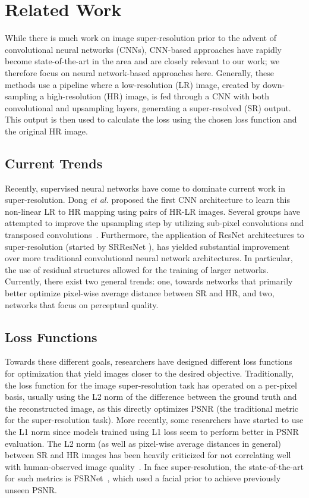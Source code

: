 \documentclass[10pt,twocolumn,letterpaper]{article}
\begin{document}
\section{Related Work}

While there is much work on image super-resolution prior to the advent of convolutional neural networks (CNNs), CNN-based approaches have rapidly become state-of-the-art in the area and are closely relevant to our work; we therefore focus on neural network-based approaches here. Generally, these methods use a pipeline where a low-resolution (LR) image, created by down-sampling a high-resolution (HR) image, is fed through a CNN with both convolutional and upsampling layers, generating a super-resolved (SR) output. This output is then used to calculate the loss using the chosen loss function and the original HR image.

\subsection{Current Trends}
Recently, supervised neural networks have come to dominate current work in super-resolution. Dong \textit{et al.} \cite{10.1007/978-3-319-10593-2_13} proposed the first CNN architecture to learn this non-linear LR to HR mapping using pairs of HR-LR images. Several groups have attempted to improve the upsampling step by utilizing sub-pixel convolutions and transposed convolutions~\cite{Shi_2016_CVPR}. Furthermore, the application of ResNet architectures to super-resolution (started by SRResNet \cite{SRGAN}), has yielded substantial improvement over more traditional convolutional neural network architectures. In particular, the use of residual structures allowed for the training of larger networks. Currently, there exist two general trends: one, towards networks that primarily better optimize pixel-wise average distance between SR and HR, and two, networks that focus on perceptual quality.

\subsection{Loss Functions}
Towards these different goals, researchers have designed different loss functions for optimization that yield images closer to the desired objective. Traditionally, the loss function for the image super-resolution task has operated on a per-pixel basis, usually using the L2 norm of the difference between the ground truth and the reconstructed image, as this directly optimizes PSNR (the traditional metric for the super-resolution task). More recently, some researchers have started to use the L1 norm since models trained using L1 loss seem to perform better in PSNR evaluation. The L2 norm (as well as pixel-wise average distances in general) between SR and HR images has been heavily criticized for not correlating well with human-observed image quality~\cite{SRGAN}. In face super-resolution, the state-of-the-art for such metrics is FSRNet~\cite{chen2018fsrnet}, which used a facial prior to achieve previously unseen PSNR.
\end{document}
